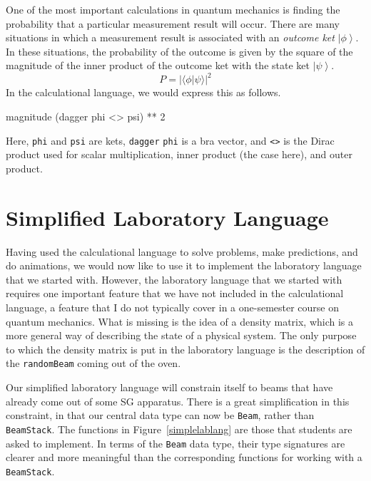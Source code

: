 \documentclass{eptcs}
\newcommand{\DataTypeTok}[1]{\textcolor[rgb]{0.56,0.13,0.00}{{#1}}}
\newcommand{\DecValTok}[1]{\textcolor[rgb]{0.25,0.63,0.44}{{#1}}}
\newcommand{\FunctionTok}[1]{\textcolor[rgb]{0.02,0.16,0.49}{{#1}}}
\newcommand{\OperatorTok}[1]{\textcolor[rgb]{0.40,0.40,0.40}{{#1}}}
\newcommand{\NormalTok}[1]{{#1}}
\newcommand{\ket}[1]{\left| #1 \right\rangle}
\newcommand{\abs}[1]{\left| #1 \right|}
\begin{document}
One of the most important calculations in quantum mechanics
is finding the probability that a particular measurement
result will occur.
There are many situations in which a measurement result is associated
with an \emph{outcome ket} $\ket{\phi}$.
In these situations, the probability of the
outcome is given by the square of the magnitude of the inner product
of the outcome ket with the state ket $\ket{\psi}$.
\[
P = \abs{\langle \phi | \psi \rangle}^2
\]
In the calculational language, we would express this as follows.
\begin{Highlighting}[]
\FunctionTok{magnitude} \NormalTok{(}\FunctionTok{dagger} \FunctionTok{phi} \OperatorTok{<>} \FunctionTok{psi}\NormalTok{) }\OperatorTok{**} \DecValTok{2}
\end{Highlighting}
Here, \FunctionTok{\texttt{phi}} and \FunctionTok{\texttt{psi}} are kets,
\FunctionTok{\texttt{dagger}} \FunctionTok{\texttt{phi}} is a bra vector,
and \OperatorTok{\texttt{<>}} is the Dirac product used for scalar multiplication,
inner product (the case here), and outer product.

\section{Simplified Laboratory Language}
\label{implablang}

Having used the calculational language to solve problems,
make predictions, and do animations, we would now like to use
it to implement the laboratory language that we started with.
However, the laboratory language that we started with
requires one important feature that we have not included
in the calculational language, a feature that I do not typically
cover in a one-semester course on quantum mechanics.
What is missing is the idea of a density matrix, which is
a more general way of describing the state of a physical
system.  The only purpose to which the density matrix is put
in the laboratory language is the description of the
\FunctionTok{\texttt{randomBeam}} coming out of the oven.

Our simplified laboratory language will constrain itself
to beams that have already come out of some SG apparatus.
There is a great simplification in this constraint,
in that our central data type can now be \DataTypeTok{\texttt{Beam}},
rather than \DataTypeTok{\texttt{BeamStack}}.
The functions in Figure~\ref{simplelablang} are those that students
are asked to implement.  In terms of the \DataTypeTok{\texttt{Beam}}
data type, their type signatures are clearer and more meaningful
than the corresponding functions for working with a
\DataTypeTok{\texttt{BeamStack}}.
\end{document}
